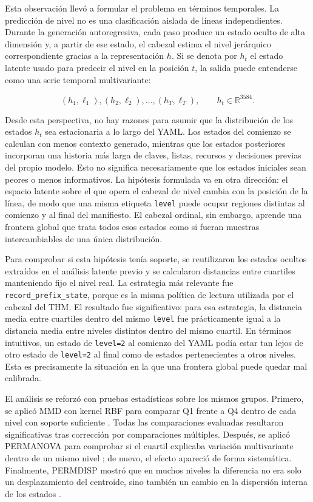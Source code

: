 Esta observación llevó a formular el problema en términos temporales. La predicción de nivel no es una clasificación aislada de líneas independientes. Durante la generación
autoregresiva, cada paso produce un estado oculto de alta dimensión y, a partir de ese estado, el cabezal estima el nivel jerárquico correspondiente gracias a la representación $h$.
Si se denota por $h_t$ el
estado latente usado para predecir el nivel en la posición $t$, la salida puede entenderse como una serie temporal multivariante:

\[
(h_1, \ell_1), (h_2, \ell_2), \ldots, (h_T, \ell_T),
\qquad h_t \in \mathbb{R}^{3584}.
\]

Desde esta perspectiva, no hay razones para asumir que la distribución de los estados $h_t$ sea estacionaria a lo largo del YAML. Los estados del comienzo se calculan con menos
contexto generado, mientras que los estados posteriores incorporan una historia más larga de claves, listas, recursos y decisiones previas del propio modelo. Esto no significa necesariamente
que los estados iniciales sean peores o menos informativos. La hipótesis formulada va en otra dirección: el espacio latente sobre el que opera el cabezal de nivel cambia con la posición de
la línea, de modo que una misma etiqueta \texttt{level} puede ocupar regiones distintas al comienzo y al final del manifiesto. El cabezal ordinal, sin embargo, aprende una frontera
global que trata todos esos estados como si fueran muestras intercambiables de una única distribución.

Para comprobar si esta hipótesis tenía soporte, se reutilizaron los estados ocultos extraídos en el análisis latente previo y se calcularon distancias entre cuartiles
manteniendo fijo el nivel real. La estrategia más relevante fue \texttt{record\_prefix\_state}, porque es la misma política de lectura utilizada por el cabezal del THM. El resultado
fue significativo: para esa estrategia, la distancia media entre cuartiles dentro del mismo \texttt{level} fue prácticamente igual a la distancia media entre niveles distintos
dentro del mismo cuartil. En términos intuitivos, un estado de \texttt{level=2} al comienzo del YAML podía estar tan lejos de otro estado de \texttt{level=2} al final como de estados
pertenecientes a otros niveles. Esta es precisamente la situación en la que una frontera global puede quedar mal calibrada.

El análisis se reforzó con pruebas estadísticas sobre los mismos grupos. Primero, se aplicó MMD con kernel RBF para comparar Q1 frente a Q4 dentro de cada nivel con soporte
suficiente \citep{gretton2012kernel}. Todas las comparaciones evaluadas resultaron significativas tras corrección por comparaciones múltiples. Después, se aplicó PERMANOVA para comprobar si el cuartil
explicaba variación multivariante dentro de un mismo nivel \citep{anderson2001permanova}; de nuevo, el efecto apareció de forma sistemática. Finalmente, PERMDISP mostró que en muchos niveles la diferencia no
era solo un desplazamiento del centroide, sino también un cambio en la dispersión interna de los estados \citep{anderson2006permdisp}.

